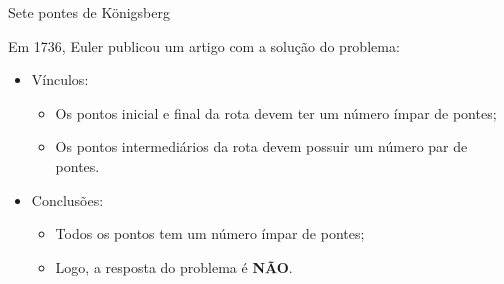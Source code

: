 \documentclass[12pt,mathserif,aspectratio=169]{beamer}
\begin{document}
\begin{frame}{Sete pontes de Königsberg}
    \begin{flushleft}
        Em 1736, Euler publicou um artigo com a solução do problema:
        
        \begin{itemize}
            \item Vínculos:
            \begin{itemize}
                \item Os pontos inicial e final da rota devem ter um número ímpar de pontes;
                \item Os pontos intermediários da rota devem possuir um número par de pontes.
            \end{itemize}
            
            \item Conclusões:
            \begin{itemize}
                \item Todos os pontos tem um número ímpar de pontes;
                \item Logo, a resposta do problema é {\bf NÃO}.
            \end{itemize}
        \end{itemize}
    \end{flushleft}
\end{frame}
\end{document}
